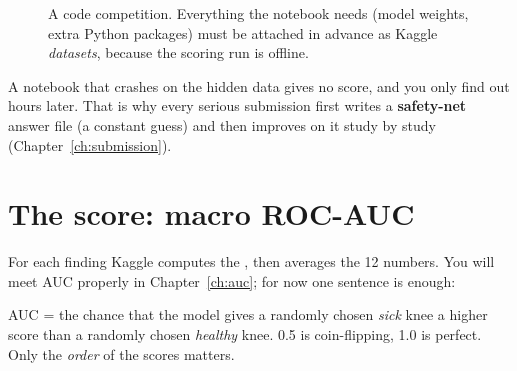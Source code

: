 \begin{figure}[H]
\centering
{}
\caption{A code competition. Everything the notebook needs (model weights, extra Python packages) must be
attached in advance as Kaggle \emph{datasets}, because the scoring run is offline.}
\end{figure}

\begin{watchout}
A notebook that crashes on the hidden data gives no score, and you only find out hours later. That is why
every serious submission first writes a \textbf{safety-net} answer file (a constant guess) and then improves
on it study by study (Chapter~\ref{ch:submission}).
\end{watchout}

\section{The score: macro ROC-AUC}

For each finding Kaggle computes the , then averages the 12 numbers. You will meet AUC properly
in Chapter~\ref{ch:auc}; for now one sentence is enough:

\begin{keyidea}
AUC = the chance that the model gives a randomly chosen \emph{sick} knee a higher score than a randomly chosen
\emph{healthy} knee. 0.5 is coin-flipping, 1.0 is perfect. Only the \emph{order} of the scores matters.
\end{keyidea}

